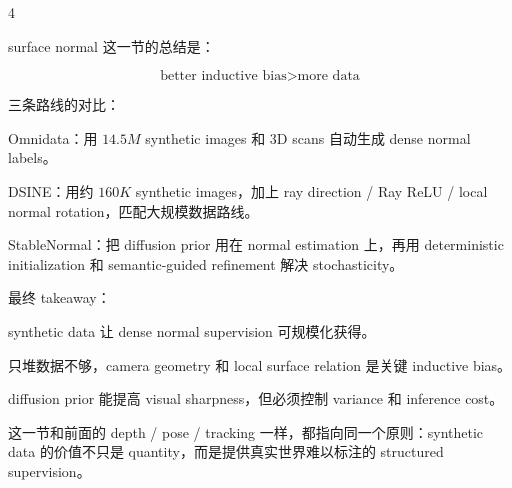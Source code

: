 \documentclass[8pt,a4paper,landscape]{extarticle}
\newcommand{\Body}[1]{{\tiny #1\par}}
\begin{document}
\begin{multicols*}{4}
\Body{surface normal 这一节的总结是：}
\[
\text{better inductive bias} > \text{more data}
\]
\Body{三条路线的对比：}
\Body{\textbullet{} Omnidata：用 $14.5M$ synthetic images 和 3D scans 自动生成 dense normal labels。}
\Body{\textbullet{} DSINE：用约 $160K$ synthetic images，加上 ray direction / Ray ReLU / local normal rotation，匹配大规模数据路线。}
\Body{\textbullet{} StableNormal：把 diffusion prior 用在 normal estimation 上，再用 deterministic initialization 和 semantic-guided refinement 解决 stochasticity。}
\Body{最终 takeaway：}
\Body{\textbullet{} synthetic data 让 dense normal supervision 可规模化获得。}
\Body{\textbullet{} 只堆数据不够，camera geometry 和 local surface relation 是关键 inductive bias。}
\Body{\textbullet{} diffusion prior 能提高 visual sharpness，但必须控制 variance 和 inference cost。}
\Body{\textbullet{} 这一节和前面的 depth / pose / tracking 一样，都指向同一个原则：synthetic data 的价值不只是 quantity，而是提供真实世界难以标注的 structured supervision。}


\end{multicols*}
\end{document}
